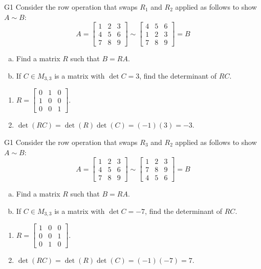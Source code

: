 \begin{problem}{G1}
Consider the row operation that swaps \(R_1\) and \(R_2\) applied as follows to show
\(A\sim B\):
\[
A=\begin{bmatrix}1&2&3\\4&5&6\\7&8&9\end{bmatrix}
  \sim
\begin{bmatrix}4&5&6\\1&2&3\\7&8&9\end{bmatrix}=B
\]
\begin{enumerate}[(a)]
\item Find a matrix \(R\) such that \(B=RA\).
\item If \(C \in M_{3,3}\) is a matrix with \(\det C = 3\), find the determinant of \(RC\).
\end{enumerate}
\end{problem}
\begin{solution}
\begin{enumerate}
\item \(R= \begin{bmatrix} 0 & 1 & 0 \\ 1 & 0 & 0 \\ 0 & 0 & 1 \end{bmatrix}\).
\item \(\det(RC)= \det(R)\det(C)=(-1)(3)=-3\).
\end{enumerate}
\end{solution}

\begin{problem}{G1}
Consider the row operation that swaps \(R_3\) and \(R_2\) applied as follows to show
\(A\sim B\):
\[
A=\begin{bmatrix}1&2&3\\4&5&6\\7&8&9\end{bmatrix}
  \sim
\begin{bmatrix}1&2&3\\7&8&9\\4&5&6\end{bmatrix}=B
\]
\begin{enumerate}[(a)]
\item Find a matrix \(R\) such that \(B=RA\).
\item If \(C \in M_{3,3}\) is a matrix with \(\det C = -7\), find the determinant of \(RC\).
\end{enumerate}
\end{problem}
\begin{solution}
\begin{enumerate}
\item \(R= \begin{bmatrix} 1 & 0 & 0 \\ 0 & 0 & 1 \\ 0 & 1 & 0 \end{bmatrix}\).
\item \(\det(RC)= \det(R)\det(C)=(-1)(-7)=7\).
\end{enumerate}
\end{solution}

